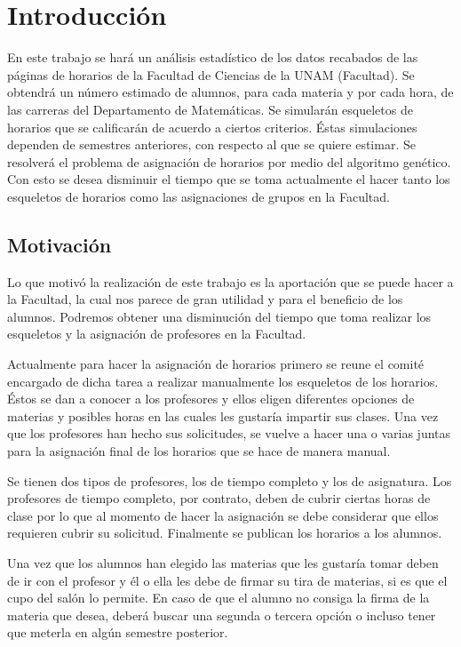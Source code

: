 \chapter{Introducción}

En este trabajo se hará un análisis estadístico de los datos recabados de las páginas de horarios de la Facultad de Ciencias de la UNAM (Facultad). Se obtendrá un número estimado de alumnos, para cada materia y por cada hora, de las carreras del Departamento de Matemáticas. Se simularán esqueletos de horarios que se calificarán de acuerdo a ciertos criterios. Éstas simulaciones dependen de semestres anteriores, con respecto al que se quiere estimar. Se resolverá el problema de asignación de horarios por medio del algoritmo genético. Con esto se desea disminuir el tiempo que se toma actualmente el hacer tanto los esqueletos de horarios como las asignaciones de grupos en la Facultad.

\section{Motivación}

Lo que motivó la realización de este trabajo es la aportación que se puede hacer a la Facultad, la cual nos parece de gran utilidad y para el beneficio de los alumnos. Podremos obtener una disminución del tiempo que toma realizar los esqueletos y la asignación de profesores en la Facultad.

Actualmente para hacer la asignación de horarios primero se reune el comité encargado de dicha tarea a realizar manualmente los esqueletos de los horarios. Éstos se dan a conocer a los profesores y ellos eligen diferentes opciones de materias y posibles horas en las cuales les gustaría impartir sus clases. Una vez que los profesores han hecho sus solicitudes, se vuelve a hacer una o varias juntas para la asignación final de los horarios que se hace de manera manual.

Se tienen dos tipos de profesores, los de tiempo completo y los de asignatura. Los profesores de tiempo completo, por contrato, deben de cubrir ciertas horas de clase por lo que al momento de hacer la asignación se debe considerar que ellos requieren cubrir su solicitud. Finalmente se publican los horarios a los alumnos.

Una vez que los alumnos han elegido las materias que les gustaría tomar deben de ir con el profesor y él o ella les debe de firmar su tira de materias, si es que el cupo del salón lo permite. En caso de que el alumno no consiga la firma de la materia que desea, deberá buscar una segunda o tercera opción o incluso tener que meterla en algún semestre posterior.


